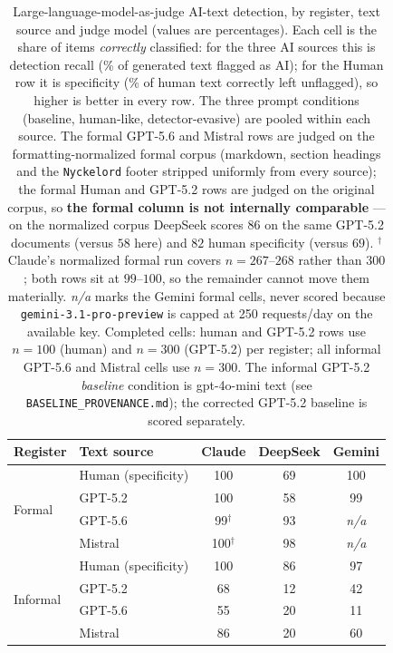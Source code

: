 \begin{table}[htbp]
  \centering
  \small
  \caption{Large-language-model-as-judge AI-text detection, by register, text
  source and judge model (values are percentages). Each cell is the share of
  items \emph{correctly} classified: for the three AI sources this is detection
  recall (\% of generated text flagged as AI); for the Human row it is
  specificity (\% of human text correctly left unflagged), so higher is better in
  every row. The three prompt conditions (baseline, human-like, detector-evasive)
  are pooled within each source. The formal GPT-5.6 and Mistral rows are judged on the
  formatting-normalized formal corpus (markdown, section headings and the
  \texttt{Nyckelord} footer stripped uniformly from every source); the formal Human and
  GPT-5.2 rows are judged on the original corpus, so \textbf{the formal column is not
  internally comparable} --- on the normalized corpus DeepSeek scores $86$ on the same
  GPT-5.2 documents (versus $58$ here) and $82$ human specificity (versus $69$).
  $^\dagger$Claude's normalized formal run covers $n=267$--$268$ rather than $300$;
  both rows sit at $99$--$100$, so the remainder cannot move them materially.
  \emph{n/a} marks the Gemini formal cells, never scored because
  \texttt{gemini-3.1-pro-preview} is capped at 250 requests/day on the available key.
  Completed cells: human and GPT-5.2 rows use $n=100$ (human) and $n=300$ (GPT-5.2)
  per register; all informal GPT-5.6 and Mistral cells use $n=300$.
  The informal GPT-5.2 \emph{baseline} condition is gpt-4o-mini text
  (see \texttt{BASELINE\_PROVENANCE.md}); the corrected GPT-5.2 baseline is scored
  separately.}
  \label{tab:llm-judge-detection}
  \begin{tabular}{ll ccc}
    \toprule
    Register & Text source & Claude & DeepSeek & Gemini \\
    \midrule
    \multirow{4}{*}{Formal}
      & Human (specificity) & 100 & 69 & 100 \\
      & GPT-5.2             & 100 & 58 & 99 \\
      & GPT-5.6             & 99$^\dagger$  & 93 & \textit{n/a} \\
      & Mistral             & 100$^\dagger$ & 98 & \textit{n/a} \\
    \midrule
    \multirow{4}{*}{Informal}
      & Human (specificity) & 100 & 86 & 97 \\
      & GPT-5.2             & 68  & 12 & 42 \\
      & GPT-5.6             & 55  & 20 & 11 \\
      & Mistral             & 86  & 20 & 60 \\
    \bottomrule
  \end{tabular}
\end{table}
